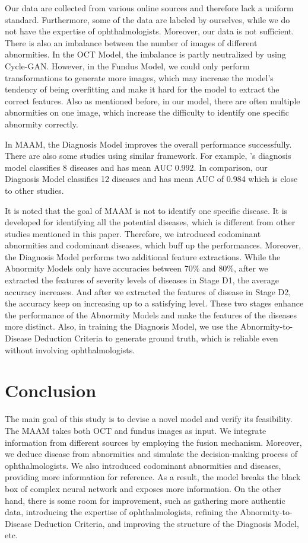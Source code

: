 \documentclass{article}
\begin{document}
	Our data are collected from various online sources and therefore lack a uniform standard. Furthermore, some of the data are labeled by ourselves, while we do not have the expertise of ophthalmologists. Moreover, our data is not sufficient. There is also an imbalance between the number of images of different abnormities. In the OCT Model, the imbalance is partly neutralized by using Cycle-GAN. However, in the Fundus Model, we could only perform transformations to generate more images, which may increase the model's tendency of being overfitting and make it hard for the model to extract the correct features. Also as mentioned before, in our model, there are often multiple abnormities on one image, which increase the difficulty to identify one specific abnormity correctly. 
	
	\vspace{0.3cm}
	
	In MAAM, the Diagnosis Model improves the overall performance successfully. There are also some studies using similar framework. For example, \citeauthor{Son2023}'s diagnosis model classifies 8 diseases and has mean AUC 0.992\autocite{Son2023}. In comparison, our Diagnosis Model classifies 12 diseases and has mean AUC of 0.984 which is close to other studies.
	
	It is noted that the goal of MAAM is not to identify one specific disease.  It is developed for identifying all the potential diseases, which is different from other studies mentioned in this paper.  Therefore, we introduced codominant abnormities and codominant diseases, which buff up the performances. Moreover, the Diagnosis Model performs two additional feature extractions. While the Abnormity Models only have accuracies between 70\% and 80\%, after we extracted the features of severity levels of diseases in Stage D1, the average accuracy increases. And after we extracted the features of disease in Stage D2, the accuracy keep on increasing up to a satisfying level. These two stages enhance the performance of the Abnormity Models and make the features of the diseases more distinct.	Also, in training the Diagnosis Model, we use the Abnormity-to-Disease Deduction Criteria to generate ground truth, which is reliable even without involving ophthalmologists.
	
	\section{Conclusion}
	
	The main goal of this study is to devise a novel model and verify its feasibility. The MAAM takes both OCT and fundus images as input. We integrate information from different sources by employing the fusion mechanism. Moreover, we deduce disease from abnormities and simulate the decision-making process of ophthalmologists. We also introduced codominant abnormities and diseases, providing more information for reference. As a result, the model breaks the black box of complex neural network and exposes more information. On the other hand, there is some room for improvement, such as gathering more authentic data, introducing the expertise of ophthalmologists, refining the Abnormity-to-Disease Deduction Criteria, and improving the structure of the Diagnosis Model, etc.
	
\end{document}
